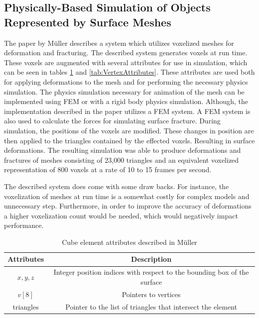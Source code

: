 \subsection{Physically-Based Simulation of Objects Represented by Surface Meshes}

The paper by Müller \etal describes a system which utilizes voxelized meshes for deformation and
fracturing. The described system generates voxels at run time. These voxels are augmented with 
several attributes for use in simulation, which can be seen in tables 
\ref{tab:CubeElementAttributes} and \ref{tab:VertexAttributes}. 
These attributes are used both for applying 
deformations to the mesh and for performing the necessary physics simulation. The physics simulation 
necessary for animation of the mesh can be implemented using FEM or with a rigid body physics 
simulation. Although, the implementation described in the paper utilizes a FEM system. A FEM
system is also used to calculate the forces for simulating surface fracture. During simulation, the 
positions of the voxels are modified. These changes in position are then
applied to the triangles contained by the effected voxels. Resulting in surface deformations. The 
resulting simulation was able to produce deformations and fractures of meshes consisting of 23,000 
triangles and an equivalent voxelized representation of 800 voxels at a rate of 10 to 15 frames per
second.

The described system does come with some draw backs. For instance, the voxelization of meshes at
run time is a somewhat costly for complex models and unnecessary step. Furthermore, in order to 
improve the accuracy of deformations a higher voxelization count would be needed, which would 
negatively impact performance. 


\begin{table}
  
\begin{center}
 \begin{tabular}{|c | c|} 
 \hline
 Attributes & Description \\ [0.5ex] 
 \hline\hline
 \(x, y, z\)& Integer position indices with respect to the bounding box of the surface  \\ 
 \hline
 \(v[8]\) & Pointers to vertices  \\
 \hline
 triangles & Pointer to the list of triangles that intersect the element\\
 \hline
\end{tabular}
\end{center}

\caption{Cube element attributes described in Müller \etal}\label{tab:CubeElementAttributes}
\end{table}

